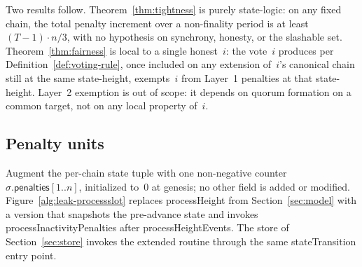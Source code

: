 \documentclass{article}
\newcommand{\penalties}{\mathsf{penalties}}
\newcommand{\stateTransition}{\textsf{stateTransition}\xspace}
\newcommand{\processHeight}{\textsf{processHeight}\xspace}
\newcommand{\processHeightEvents}{\textsf{processHeightEvents}\xspace}
\newcommand{\processInactivityPenalties}{\textsf{processInactivityPenalties}\xspace}
\theoremstyle{plain}
\theoremstyle{definition}
\theoremstyle{remark}
\begin{document}
Two results follow.
Theorem~\ref{thm:tightness} is purely state-logic: on any fixed chain, the total penalty increment over a non-finality period is at least $(T-1) \cdot n/3$, with no hypothesis on synchrony, honesty, or the slashable set.
Theorem~\ref{thm:fairness} is local to a single honest~$i$: the vote~$i$ produces per Definition~\ref{def:voting-rule}, once included on any extension of~$i$'s canonical chain still at the same state-height, exempts~$i$ from Layer~1 penalties at that state-height.
Layer~2 exemption is out of scope: it depends on quorum formation on a common target, not on any local property of~$i$.

\subsection{Penalty units}

Augment the per-chain state tuple with one non-negative counter $\sigma.\penalties[1..n]$, initialized to~$0$ at genesis; no other field is added or modified.
Figure~\ref{alg:leak-processslot} replaces \processHeight from Section~\ref{sec:model} with a version that snapshots the pre-advance state and invokes \processInactivityPenalties after \processHeightEvents.
The store of Section~\ref{sec:store} invokes the extended routine through the same \stateTransition entry point.
\end{document}
